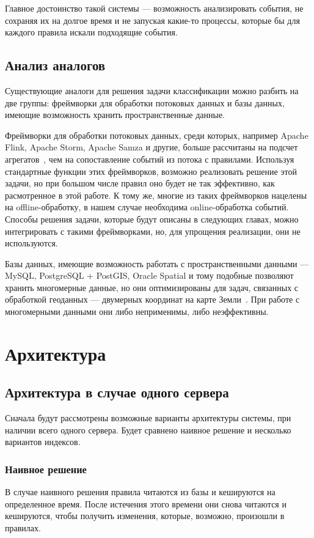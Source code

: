 \documentclass[14pt]{article}
\begin{document}
Главное достоинство такой системы --- возможность анализировать события, не сохраняя их на долгое время и не запуская какие-то процессы, которые бы для каждого правила искали подходящие события.

\subsection{Анализ аналогов}
Существующие аналоги для решения задачи классификации можно разбить на две группы: фреймворки для обработки потоковых данных и базы данных, имеющие возможность хранить пространственные данные.

Фреймворки для обработки потоковых данных, среди которых, например Apache Flink, Apache Storm, Apache Samza и другие, больше рассчитаны на подсчет агрегатов~\cite{flink-use-cases, storm-documentation, samza-streams-api}, чем на сопоставление событий из потока с правилами. Используя стандартные функции этих фреймворков, возможно реализовать решение этой задачи, но при большом числе правил оно будет не так эффективно, как расмотренное в этой работе. К тому же, многие из таких фреймворков нацелены на offline-обработку, в нашем случае необходима online-обработка событий. Способы решения задачи, которые будут описаны в следующих главах, можно интегрировать с такими фреймворками, но, для упрощения реализации, они не используются.

Базы данных, имеющие возможность работать с пространственными данными --- MySQL, PostgreSQL + PostGIS, Oracle Spatial и тому подобные позволяют хранить многомерные данные, но они оптимизированы для задач, связанных с обработкой геоданных --- двумерных координат на карте Земли~\cite{mysql-spatial, postgis, oracle-spatial}. При работе с многомерными данными они либо неприменимы, либо неэффективны.

\section{Архитектура}
\subsection{Архитектура в случае одного сервера}
Сначала будут рассмотрены возможные варианты архитектуры системы, при наличии всего одного сервера. Будет сравнено наивное решение и несколько вариантов индексов.

\subsubsection{Наивное решение}
В случае наивного решения правила читаются из базы и кешируются на определенное время. После истечения этого времени они снова читаются и кешируются, чтобы получить изменения, которые, возможно, произошли в правилах.
\end{document}
